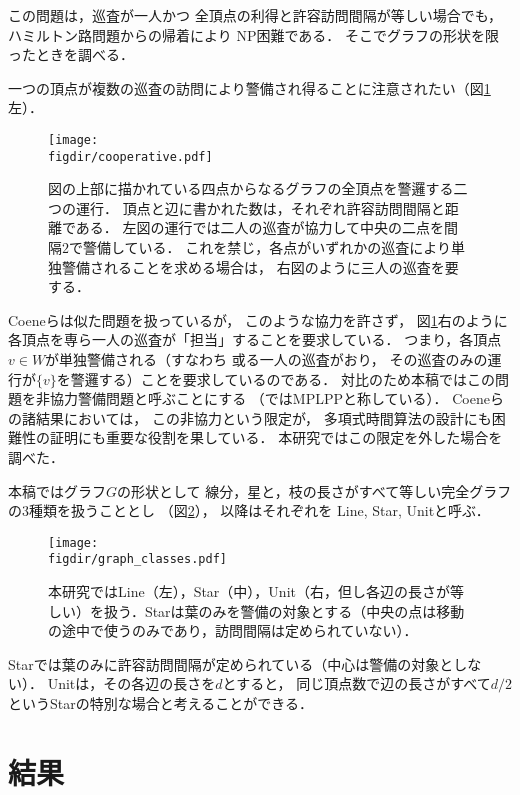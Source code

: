 \documentclass{jss}
\newcommand{\figdir}{../figures}
\begin{document}
この問題は，巡査が一人かつ
全頂点の利得と許容訪問間隔が等しい場合でも，
ハミルトン路問題からの帰着により
NP困難である\cite[Theorem~8]{coene2011charlemagne}．
そこでグラフの形状を限ったときを調べる．

一つの頂点が複数の巡査の訪問により警備され得ることに注意されたい（図\ref{figure: cooperative}左）．
\begin{figure}
  \begin{center}
    \texttt{[image: \\figdir/cooperative.pdf]}
    \caption{図の上部に描かれている四点からなるグラフの全頂点を警邏する二つの運行．
      頂点と辺に書かれた数は，それぞれ許容訪問間隔と距離である．
      左図の運行では二人の巡査が協力して中央の二点を間隔$2$で警備している．
      これを禁じ，各点がいずれかの巡査により単独警備されることを求める場合は，
      右図のように三人の巡査を要する．}
    \label{figure: cooperative}
  \end{center}
\end{figure}
Coeneら\cite{coene2011charlemagne}は似た問題を扱っているが，
このような協力を許さず，
図\ref{figure: cooperative}右のように
各頂点を専ら一人の巡査が「担当」することを要求している．
つまり，各頂点$v \in W$が単独警備される（すなわち
或る一人の巡査がおり，
その巡査のみの運行が$\{v\}$を警邏する）ことを要求しているのである．
対比のため本稿ではこの問題を非協力警備問題と呼ぶことにする
（\cite{coene2011charlemagne}ではMPLPPと称している）．
Coeneら\cite{coene2011charlemagne}の諸結果においては，
この非協力という限定が，
多項式時間算法の設計にも困難性の証明にも重要な役割を果している．
本研究ではこの限定を外した場合を調べた．

本稿ではグラフ$G$の形状として
線分，星と，枝の長さがすべて等しい完全グラフの3種類を扱うこととし
（図\ref{figure: graph_classes}），
以降はそれぞれを Line, Star, Unitと呼ぶ．
\begin{figure}
  \begin{center}
    \texttt{[image: \\figdir/graph\_classes.pdf]}
    \caption{本研究ではLine（左），Star（中），Unit（右，但し各辺の長さが等しい）を扱う．Starは葉のみを警備の対象とする（中央の点は移動の途中で使うのみであり，訪問間隔は定められていない）．}
    \label{figure: graph_classes}
  \end{center}
\end{figure}
Starでは葉のみに許容訪問間隔が定められている（中心は警備の対象としない）．
Unitは，その各辺の長さを$d$とすると，
同じ頂点数で辺の長さがすべて$d/2$というStarの特別な場合と考えることができる．

\section{結果}
\end{document}
